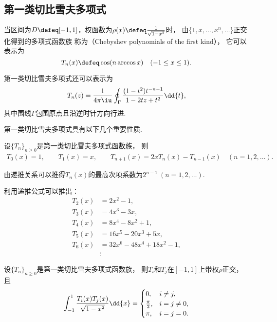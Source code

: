 \subsection{第一类切比雪夫多项式}
当区间为\(D \defeq [-1,1]\)，权函数为\(\rho(x) \defeq \frac1{\sqrt{1-x^2}}\)时，
由\(\{1,x,\dotsc,x^n,\dotsc\}\)正交化得到的多项式函数族
称为（Chebyshev polynomials of the first kind），
它可以表示为\begin{equation}
	T_n(x) \defeq \cos(n \arccos x)
	\quad(-1 \leq x \leq 1).
\end{equation}

第一类切比雪夫多项式还可以表示为\begin{equation}
	T_n(z)
	= \frac1{4\pi\iu} \oint_\Gamma \frac{(1 - t^2) t^{-n-1}}{1 - 2 t z + t^2} \dd{t},
\end{equation}
其中围线\(\Gamma\)包围原点且沿逆时针方向行进.

第一类切比雪夫多项式具有以下几个重要性质.
\begin{property}
设\(\{T_n\}_{n\geq0}\)是第一类切比雪夫多项式函数族，
则\begin{gather}
	T_0(x) = 1,
	\qquad
	T_1(x) = x,
	\qquad
	T_{n+1}(x) = 2x T_n(x) - T_{n-1}(x)
	\quad(n=1,2,\dotsc).
\end{gather}
\end{property}
\begin{remark}
由递推关系可以推得\(T_n(x)\)的最高次项系数为\(2^{n-1}\ (n=1,2,\dotsc)\).
\end{remark}

利用递推公式可以推出：\begin{align*}
	T_2(x) &= 2x^2-1, \\
	T_3(x) &= 4x^3-3x, \\
	T_4(x) &= 8x^4-8x^2+1, \\
	T_5(x) &= 16x^5-20x^3+5x, \\
	T_6(x) &= 32x^6-48x^4+18x^2-1, \\
	&\vdots
\end{align*}

\begin{property}
设\(\{T_n\}_{n\geq0}\)是第一类切比雪夫多项式函数族，
则\(T_i\)和\(T_j\)在\([-1,1]\)上带权\(\rho\)正交，
且\begin{equation}
	\def\arraystretch{1.5}
	\int_{-1}^1 \frac{T_i(x) T_j(x)}{\sqrt{1-x^2}} \dd{x}
	= \begin{cases}
		0, & i \neq j, \\
		\frac\pi2, & i = j \neq 0, \\
		\pi, & i = j = 0.
	\end{cases}
\end{equation}
\end{property}


